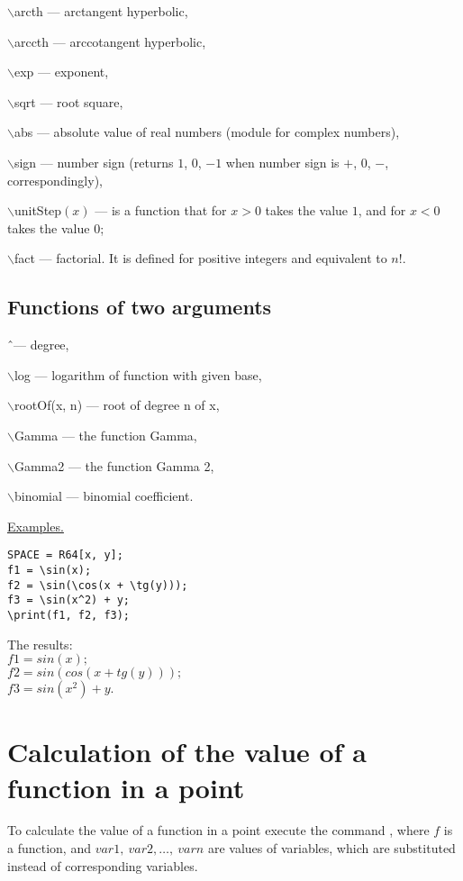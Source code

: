 $\backslash$arcth --- arctangent hyperbolic,

$\backslash$arccth --- arccotangent hyperbolic,

$\backslash$exp --- exponent,

$\backslash$sqrt --- root square,

$\backslash$abs --- absolute value of real numbers (module for complex numbers),
 
$\backslash$sign --- number sign (returns $1$, $0$, $-1$ when number sign is $+$, $0$, $-$, correspondingly),

$\backslash$unitStep$(x)$ --- is a function that for $ x> 0 $ takes the value $ 1 $, and
for $ x <0 $ takes the value $ 0 $;

$\backslash$fact --- factorial. It is defined for positive integers and equivalent to $ n! $.

\subsection{Functions of two arguments}
\hspace*{4mm}
\^\ --- degree,

$\backslash$log --- logarithm of function with given base,

$\backslash$rootOf(x, n) --- root of degree n of x,

$\backslash$Gamma --- the function Gamma,

$\backslash$Gamma2 --- the function Gamma 2,

$\backslash$binomial --- binomial coefficient.

\smallskip

\underline{Examples. }

\begin{verbatim}
SPACE = R64[x, y];
f1 = \sin(x);
f2 = \sin(\cos(x + \tg(y)));
f3 = \sin(x^2) + y;
\print(f1, f2, f3);
\end{verbatim}
\vspace*{-3mm}

The results:\\
\hspace*{4mm} $f1 = sin(x); $\\
\hspace*{4mm} $f2 = sin(cos(x+tg(y))); $\\
\hspace*{4mm} $f3 = sin(x^{2})+y. $

\section{Calculation of the value of a function in a point} 
To calculate the value of a function in a point execute the command  
, 
where $f$ is a function, and $var1,\  var2,\ldots,\ varn$ are values of variables, which are substituted instead of corresponding variables.

